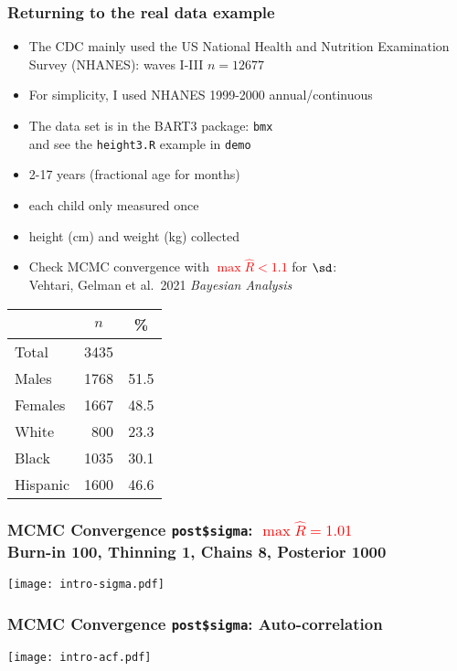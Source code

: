\documentclass[11pt,dvipsnames,usenames,times]{beamer}
\begin{document}
\begin{frame}\frametitle{Returning to the real data example}
\begin{itemize}
\item The CDC mainly used the US National Health 
and Nutrition Examination Survey (NHANES): waves I-III $n=12677$
\item For simplicity, I used NHANES 1999-2000 annual/continuous  
\item The data set is in the BART3 package: \texttt{bmx}\\
and see the \texttt{height3.R} example in \texttt{demo}
\item 2-17 years (fractional age for months)
\item each child only measured once
\item height (cm) and weight (kg) collected
\item Check MCMC convergence with \textcolor{red}{$\max \widehat{R}<1.1$} for 
\textcolor{blue}{$\sd$}:\\ 
Vehtari, Gelman et al.\ 2021 {\it Bayesian Analysis}
\end{itemize} 
\begin{center}
\begin{tabular}{l|rr}
        & \multicolumn{1}{|c}{$n$} & \multicolumn{1}{c}{\%} \\ \hline 
Total   & 3435 \\ \hline
Males   & 1768 & 51.5 \\
Females & 1667 & 48.5 \\ \hline
White   &  800 & 23.3 \\
Black   & 1035 & 30.1 \\
Hispanic& 1600 & 46.6 
\end{tabular}
\end{center}
\end{frame}

\begin{frame}\frametitle{MCMC Convergence \texttt{post\$sigma}:
\textcolor{red}{$\max \widehat{R}=1.01$} \\
Burn-in 100, Thinning 1, Chains 8, Posterior 1000}
\begin{center}
\texttt{[image: intro-sigma.pdf]}
\end{center}
\end{frame}

\begin{frame}\frametitle{MCMC Convergence \texttt{post\$sigma}: Auto-correlation}
\begin{center}
\texttt{[image: intro-acf.pdf]}
\end{center}
\end{frame}
\end{document}
